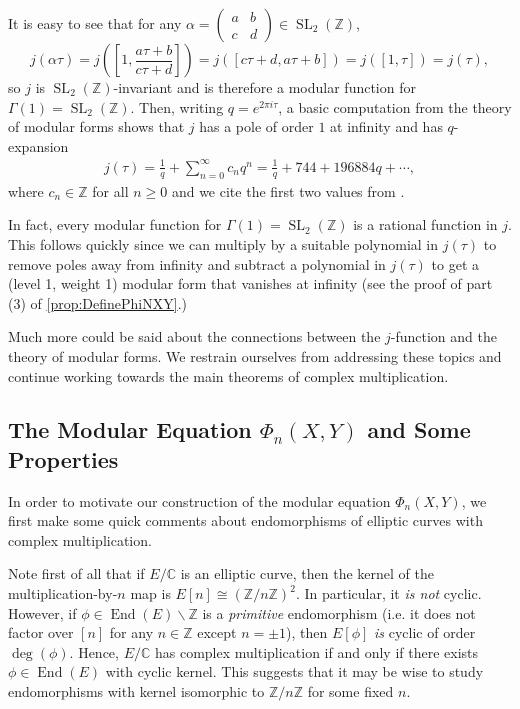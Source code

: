 \documentclass{amsart}
\theoremstyle{definition}
\theoremstyle{remark}
\numberwithin{equation}{section}
\newcommand{\bbC}{\mathbb C}
\newcommand{\bbZ}{\mathbb Z}
\newcommand{\twobytwo}[4]{\left(\begin{array}{cc} #1 & #2 \\ #3 & #4\end{array} \right)}
\DeclareMathOperator{\End}{End}
\DeclareMathOperator{\SL}{SL}
\begin{document}
It is easy to see that for any $\alpha = \twobytwo{a}{b}{c}{d} \in \SL_{2}(\bbZ)$,
\[
 j(\alpha \tau) = j\left(\left[1, \frac{a\tau + b}{c\tau + d}\right]\right) = j([c\tau + d, a\tau + b]) = j([1,\tau]) = j(\tau),
\]
so $j$ is $\SL_{2}(\bbZ)$-invariant and is therefore a modular function for $\Gamma(1) = \SL_{2}(\bbZ)$. Then, writing $q = e^{2\pi i \tau}$, a basic computation from the theory of modular forms shows that $j$ has a pole of order $1$ at infinity and has $q$-expansion
\begin{align} \label{eqn:QExpansionOfJ}
 j(\tau) = \frac{1}{q} + \sum_{n=0}^{\infty} c_{n} q^n = \frac{1}{q} + 744 + 196884q + \cdots,
\end{align}
where $c_{n} \in \bbZ$ for all $n \geq 0$ and we cite the first two values from \cite{CoxPrimes}.

In fact, every modular function for $\Gamma(1) = \SL_{2}(\bbZ)$ is a rational function in $j$. This follows quickly since we can multiply by a suitable polynomial in $j(\tau)$ to remove poles away from infinity and subtract a polynomial in $j(\tau)$ to get a (level 1, weight 1) modular form that vanishes at infinity (see the proof of part (3) of \ref{prop:DefinePhiNXY}.)

Much more could be said about the connections between the $j$-function and the theory of modular forms. We restrain ourselves from addressing these topics and continue working towards the main theorems of complex multiplication.

\subsection{The Modular Equation $\Phi_{n}(X,Y)$ and Some Properties} \label{subsec:ModularEquation}

In order to motivate our construction of the modular equation $\Phi_{n}(X, Y)$, we first make some quick comments about endomorphisms of elliptic curves with complex multiplication.

Note first of all that if $E/\bbC$ is an elliptic curve, then the kernel of the multiplication-by-$n$ map is $E[n] \cong (\bbZ/n\bbZ)^2$. In particular, it \emph{is not} cyclic. However, if $\phi \in \End(E) \smallsetminus \bbZ$ is a \emph{primitive} endomorphism (i.e. it does not factor over $[n]$ for any $n \in \bbZ$ except $n = \pm 1$), then $E[\phi]$ \emph{is} cyclic of order $\deg(\phi)$. Hence, $E/\bbC$ has complex multiplication if and only if there exists $\phi \in \End(E)$ with cyclic kernel. This suggests that it may be wise to study endomorphisms with kernel isomorphic to $\bbZ/n \bbZ$ for some fixed $n$.
\end{document}
